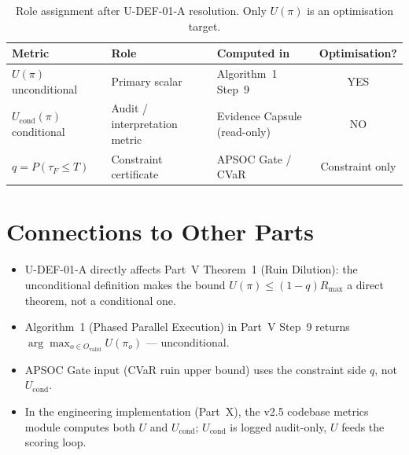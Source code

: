 \begin{table}[ht]
\centering
\small
\begin{tabularx}{\linewidth}{lXXc}
\toprule
\textbf{Metric} & \textbf{Role} & \textbf{Computed in} & \textbf{Optimisation?} \\
\midrule

$U(\pi)$ unconditional
& Primary scalar
& Algorithm~1 Step~9
& YES \\

$U_{\mathrm{cond}}(\pi)$ conditional
& Audit / interpretation metric
& Evidence Capsule (read-only)
& NO \\

$q = P(\tau_F \le T)$
& Constraint certificate
& APSOC Gate / CVaR
& Constraint only \\

\bottomrule
\end{tabularx}
\caption[U-DEF-01 role assignment]{Role assignment after U-DEF-01-A
resolution. Only $U(\pi)$ is an optimisation target.}
\label{tab:u-def-01-roles}
\end{table}

\section*{Connections to Other Parts}

\begin{itemize}
\item U-DEF-01-A directly affects Part~V Theorem~1 (Ruin Dilution):
the unconditional definition makes the bound $U(\pi) \le (1 - q)
R_{\max}$ a direct theorem, not a conditional one.
\item Algorithm~1 (Phased Parallel Execution) in Part~V Step~9
returns $\arg\max_{o \in O_{\mathrm{valid}}} U(\pi_o)$ ---
unconditional.
\item APSOC Gate input (CVaR ruin upper bound) uses the constraint
side $q$, not $U_{\mathrm{cond}}$.
\item In the engineering implementation (Part~X), the v2.5 codebase
metrics module computes both $U$ and $U_{\mathrm{cond}}$;
$U_{\mathrm{cond}}$ is logged audit-only, $U$ feeds the scoring
loop.
\end{itemize}
